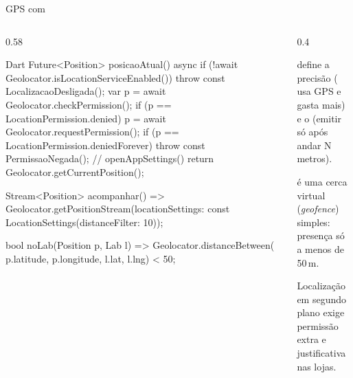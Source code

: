 \documentclass[aspectratio=169,10pt]{beamer}
\begin{document}
\begin{frame}[fragile]{GPS com }
  \begin{columns}[T]
    \begin{column}{0.58\textwidth}
\begin{codigo}[title=data/services/localizacao\_service.dart]{Dart}
Future<Position> posicaoAtual() async {
  if (!await Geolocator.isLocationServiceEnabled()) {
    throw const LocalizacaoDesligada();
  }
  var p = await Geolocator.checkPermission();
  if (p == LocationPermission.denied) {
    p = await Geolocator.requestPermission();
  }
  if (p == LocationPermission.deniedForever) {
    throw const PermissaoNegada();   // openAppSettings()
  }
  return Geolocator.getCurrentPosition();
}

Stream<Position> acompanhar() =>
    Geolocator.getPositionStream(locationSettings:
        const LocationSettings(distanceFilter: 10));

bool noLab(Position p, Lab l) => Geolocator.distanceBetween(
    p.latitude, p.longitude, l.lat, l.lng) < 50;
\end{codigo}
    \end{column}
    \begin{column}{0.4\textwidth}
      \begin{conceito}
         define a precisão ( usa GPS e gasta mais) e o  (emitir só após andar N metros).
      \end{conceito}
      \begin{dica}[Check-in]
         é uma cerca virtual (\emph{geofence}) simples: presença só a menos de 50\,m.
      \end{dica}
      \begin{atencao}
        Localização em segundo plano exige permissão extra e justificativa nas lojas.
      \end{atencao}
    \end{column}
  \end{columns}
\end{frame}
\end{document}
